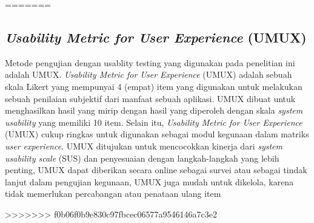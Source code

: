 
=======

\subsection{\textit{Usability Metric for User Experience }(UMUX)} Metode pengujian dengan usablity testing yang digunakan pada penelitian ini adalah UMUX. \textit{Usability Metric for User Experience} (UMUX) adalah sebuah skala Likert yang mempunyai 4 (empat) item yang digunakan untuk melakukan sebuah penilaian subjektif dari manfaat sebuah aplikasi. UMUX dibuat untuk menghasilkan hasil yang mirip dengan hasil yang diperoleh dengan skala \textit{system usability} yang memiliki 10 item. Selain itu, \textit{Usability Metric for User Experience} (UMUX) cukup ringkas untuk digunakan sebagai modul kegunaan dalam matriks \textit{user experience}. UMUX ditujukan untuk mencocokkan kinerja dari \textit{system usability scale} (SUS) dan penyesuaian dengan langkah-langkah yang lebih penting, UMUX dapat diberikan secara online sebagai survei atau sebagai tindak lanjut dalam pengujian kegunaan, UMUX juga mudah untuk dikelola, karena tidak memerlukan percabangan atau penataan ulang item \citep{Finstad2010}


>>>>>>> f0b06f0b9e830c97fbcec06577a9546146a7c3e2

